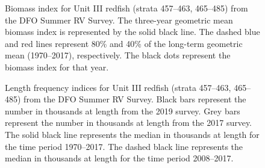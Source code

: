 \documentclass[11pt]{book}
\begin{document}
\begin{figure}[htb]

{\centering {} 

}

\caption{Biomass index for Unit III redfish (strata 457--463, 465--485) from the DFO Summer RV Survey. The three-year geometric mean biomass index is represented by the solid black line. The dashed blue and red lines represent 80\% and 40\% of the long-term geometric mean (1970--2017), respectively. The black dots represent the biomass index for that year.}\label{fig:39-fig-redfish-biomassUnitIII}
\end{figure}

\begin{figure}[htb]

{\centering {} 

}

\caption{Length frequency indices for Unit III redfish (strata 457--463, 465--485) from the DFO Summer RV Survey. Black bars represent the number in thousands at length from the 2019 survey. Grey bars represent the number in thousands at length from the 2017 survey. The solid black line represents the median in thousands at length for the time period 1970--2017. The dashed black line represents the median in thousands at length for the time period 2008--2017.}\label{fig:40-fig-redfish-lengthfreqUnitIII}
\end{figure}
\end{document}

